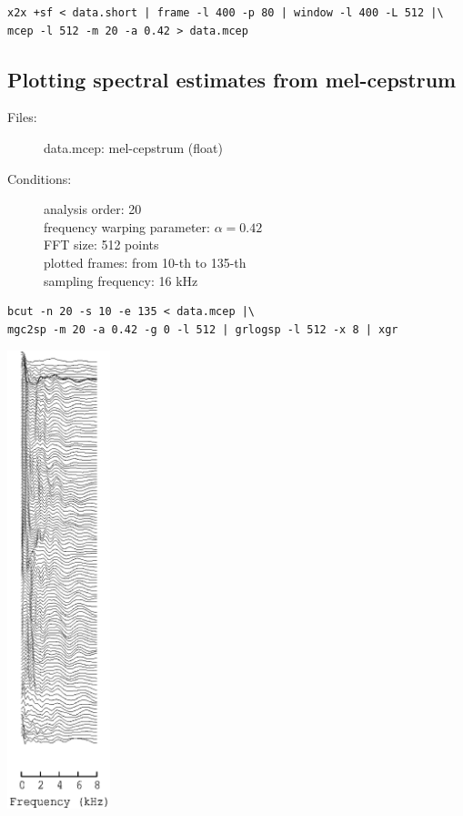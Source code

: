 \documentclass[a4paper,10pt]{article}
\begin{document}
\begin{verbatim}
x2x +sf < data.short | frame -l 400 -p 80 | window -l 400 -L 512 |\
mcep -l 512 -m 20 -a 0.42 > data.mcep
\end{verbatim}

\subsection{Plotting spectral estimates from mel-cepstrum}

\begin{description}
\item[Files:]
  data.mcep: mel-cepstrum (float)
\item[Conditions:]
  analysis order: 20\\
  frequency warping parameter: $\alpha = 0.42$\\
  FFT size: 512 points\\
  plotted frames: from 10-th to 135-th\\
  sampling frequency: 16 kHz
\end{description}

\begin{verbatim}
bcut -n 20 -s 10 -e 135 < data.mcep |\
mgc2sp -m 20 -a 0.42 -g 0 -l 512 | grlogsp -l 512 -x 8 | xgr
\end{verbatim}

\includegraphics[width=3cm]{data.mcep.grlogsp.eps}
\end{document}

